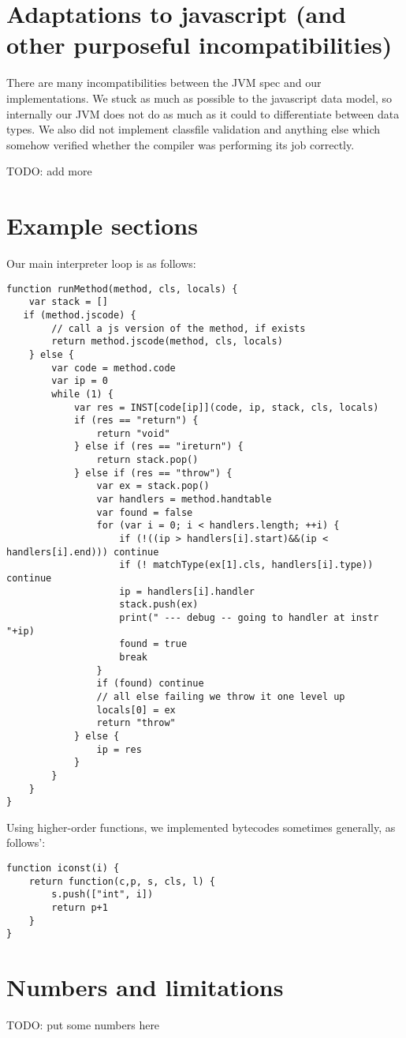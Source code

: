 \documentclass{article}
\begin{document}
\section{Adaptations to javascript (and other purposeful incompatibilities)}
\label{sec:adapt-javascr-and}

There are many incompatibilities between the JVM spec and our
implementations. We stuck as much as possible to the javascript data
model, so internally our JVM does not do as much as it could to
differentiate between data types. We also did not implement classfile
validation and anything else which somehow verified whether the
compiler was performing its job correctly.

TODO: add more

\section{Example sections}
\label{sec:example-sections}


Our main interpreter loop is as follows:
\begin{verbatim}
function runMethod(method, cls, locals) {
    var stack = []
   if (method.jscode) {
        // call a js version of the method, if exists
        return method.jscode(method, cls, locals)
    } else {
        var code = method.code
        var ip = 0
        while (1) {
            var res = INST[code[ip]](code, ip, stack, cls, locals)
            if (res == "return") {
                return "void"
            } else if (res == "ireturn") {
                return stack.pop()
            } else if (res == "throw") {
                var ex = stack.pop()
                var handlers = method.handtable
                var found = false
                for (var i = 0; i < handlers.length; ++i) {
                    if (!((ip > handlers[i].start)&&(ip < handlers[i].end))) continue
                    if (! matchType(ex[1].cls, handlers[i].type)) continue
                    ip = handlers[i].handler
                    stack.push(ex)
                    print(" --- debug -- going to handler at instr "+ip)
                    found = true
                    break
                }
                if (found) continue
                // all else failing we throw it one level up
                locals[0] = ex
                return "throw"
            } else {
                ip = res
            }
        }
    }
}
\end{verbatim}

Using higher-order functions, we implemented bytecodes sometimes
generally, as follows':
\begin{verbatim}
function iconst(i) { 
    return function(c,p, s, cls, l) { 
        s.push(["int", i]) 
        return p+1 
    }
}
\end{verbatim}

\section{Numbers and limitations}
\label{sec:numbers-limitations}

TODO: put some numbers here
\end{document}
